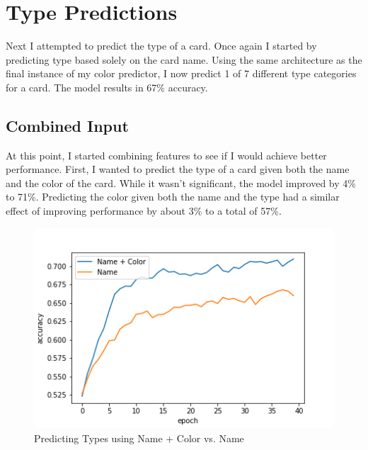 \section{Type Predictions}
\label{sec:type_predicts}

Next I attempted to predict the type of a card.
Once again I started by predicting type based solely on 
the card name. Using the same architecture as the final
instance of my color predictor, I now predict 1 of 7 
different type categories for a card. 
The model results in 67\% accuracy. 

\subsection{Combined Input}
At this point, I started combining features to 
see if I would achieve better performance. First, 
I wanted to predict the type of a card given both
the name and the color of the card. While it wasn't
significant, the model improved by 4\% to 71\%. Predicting
the color given both the name and the type had a
similar effect of improving performance by about 3\% to
a total of 57\%. 

\begin{figure}[h!]
    \centering
    \includegraphics[width=0.9\linewidth]{figures/glove_color_vs_no.png}
    \caption{Predicting Types using Name + Color vs. Name}
    \label{fig:color_no_color}
\end{figure}
